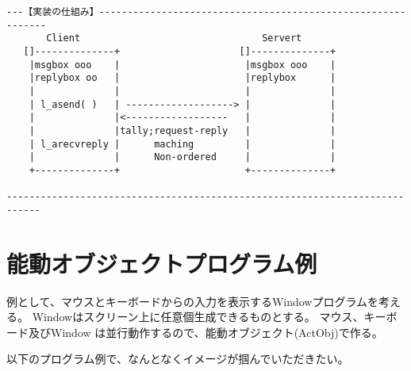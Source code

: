 \begin{verbatim}
---【実装の仕組み】-------------------------------------------------------------
       Client                                Servert
   []--------------+                     []--------------+
    |msgbox ooo    |                      |msgbox ooo    |
    |replybox oo   |                      |replybox      |
    |              |                      |              |
    | l_asend( )   | -------------------> |              |
    |              |<------------------   |              |
    |              |tally;request-reply   |              |
    | l_arecvreply |      maching         |              |
    |              |      Non-ordered     |              |
    +--------------+                      +--------------+

----------------------------------------------------------------------------
\end{verbatim}


\section{能動オブジェクトプログラム例}

例として、マウスとキーボードからの入力を表示するWindowプログラムを考える。
Windowはスクリーン上に任意個生成できるものとする。
マウス、キーボード及びWindow は並行動作するので、能動オブジェクト(ActObj)で作る。

以下のプログラム例で、なんとなくイメージが掴んでいただきたい。

